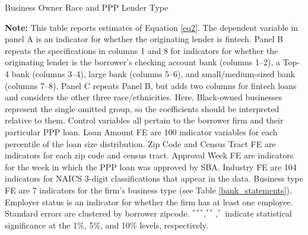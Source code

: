 \documentclass[11pt]{article}
\begin{document}
\newpage
\begin{table}[H]
	\caption{Business Owner Race and PPP Lender Type} \label{regs_racefintech_fe}
	\begin{adjustbox}{width=\linewidth}
		
	\end{adjustbox}
	
	\begin{adjustbox}{width=\linewidth}
		
	\end{adjustbox}
\end{table}
\begin{landscape}
    \begin{table}[H]
        \begin{adjustbox}{width=\linewidth, center}
            
        \end{adjustbox}
        \begin{minipage}{\linewidth} \medskip
            \footnotesize{{\bf Note: }This table reports estimates of Equation \ref{eq2}. The dependent variable in panel A is an indicator for whether the originating lender is fintech. Panel B repeats the specifications in columns 1 and 8 for indicators for whether the originating lender is the borrower's checking account bank (columns 1--2), a Top-4 bank (columns 3--4), large bank (columns 5--6), and small/medium-sized bank (columns 7--8). Panel C repeats Panel B, but adds two columns for fintech loans and considers the other three race/ethnicities. Here, Black-owned businesses represent the single omitted group, so the coefficients should be interpreted relative to them. Control variables all pertain to the borrower firm and their particular PPP loan. Loan Amount FE are 100 indicator variables for each percentile of the loan size distribution. Zip Code and Census Tract FE are indicators for each zip code and census tract. Approval Week FE are indicators for the week in which the PPP loan was approved by SBA. Industry FE are 104 indicators for NAICS 3-digit classifications that appear in the data. Business type FE are 7 indicators for the firm's business type (see Table \ref{bank_statements}). Employer status is an indicator for whether the firm has at least one employee. Standard errors are clustered by borrower zipcode. $^{***}, ^{**}, ^{*}$ indicate statistical significance at the 1\%, 5\%, and 10\% levels, respectively.}
        \end{minipage}
    \end{table}
\end{landscape}
\end{document}
